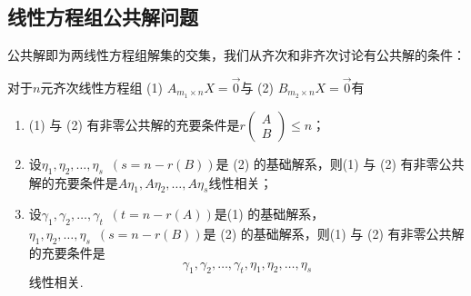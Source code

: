 \subsection{线性方程组公共解问题}

公共解即为两线性方程组解集的交集，我们从齐次和非齐次讨论有公共解的条件：
\begin{theorem}{}{}
    对于$n$元齐次线性方程组 (1) $A_{m_1 \times n}X=\vec{0}$与 (2) $B_{m_2 \times n}X=\vec{0}$有
    \begin{enumerate}
        \item (1) 与 (2) 有非零公共解的充要条件是$r\begin{pmatrix} A \\ B \end{pmatrix} \leqslant n$；

        \item 设$\eta_1,\eta_2,\ldots,\eta_s\enspace(s=n-r(B))$是 (2) 的基础解系，则(1) 与 (2) 有非零公共解的充要条件是$A\eta_1,A\eta_2,\ldots,A\eta_s$线性相关；

        \item 设$\gamma_1,\gamma_2,\ldots,\gamma_t\enspace(t=n-r(A))$是(1) 的基础解系，$\eta_1,\eta_2,\ldots,\eta_s\enspace(s=n-r(B))$是 (2) 的基础解系，则(1) 与 (2) 有非零公共解的充要条件是
              \[\gamma_1,\gamma_2,\ldots,\gamma_t,\eta_1,\eta_2,\ldots,\eta_s\]
              线性相关.
    \end{enumerate}
\end{theorem}

